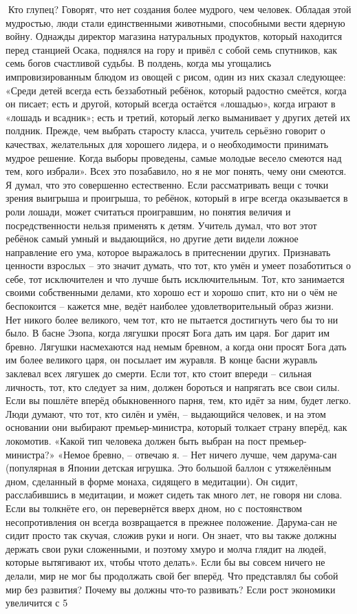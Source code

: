 \documentclass[a4paper]{book}
\begin{document}
Кто глупец?
Говорят, что нет создания более мудрого, чем человек. Обладая этой мудростью, люди
стали единственными животными, способными вести ядерную войну.
Однажды директор магазина натуральных продуктов, который находится перед
станцией Осака, поднялся на гору и привёл с собой семь спутников, как семь богов
счастливой судьбы. В полдень, когда мы угощались импровизированным блюдом из овощей с
рисом, один из них сказал следующее: «Среди детей всегда есть беззаботный ребёнок,
который радостно смеётся, когда он писает; есть и другой, который всегда остаётся
«лошадью», когда играют в «лошадь и всадник»; есть и третий, который легко выманивает у
других детей их полдник. Прежде, чем выбрать старосту класса, учитель серьёзно говорит о
качествах, желательных для хорошего лидера, и о необходимости принимать мудрое решение.
Когда выборы проведены, самые молодые весело смеются над тем, кого избрали».
Всех это позабавило, но я не мог понять, чему они смеются. Я думал, что это
совершенно естественно. Если рассматривать вещи с точки зрения выигрыша и проигрыша,
то ребёнок, который в игре всегда оказывается в роли лошади, может считаться
проигравшим, но понятия величия и посредственности нельзя применять к детям. Учитель
думал, что вот этот ребёнок самый умный и выдающийся, но другие дети видели ложное
направление его ума, которое выражалось в притеснении других. Признавать ценности
взрослых – это значит думать, что тот, кто умён и умеет позаботиться о себе, тот
исключителен и что лучше быть исключительным. Тот, кто занимается своими
собственными делами, кто хорошо ест и хорошо спит, кто ни о чём не беспокоится – кажется
мне, ведёт наиболее удовлетворительный образ жизни. Нет никого более великого, чем тот,
кто не пытается достигнуть чего бы то ни было.
В басне Эзопа, когда лягушки просят Бога дать им царя. Бог дарит им бревно. Лягушки
насмехаются над немым бревном, а когда они просят Бога дать им более великого царя, он
посылает им журавля. В конце басни журавль заклевал всех лягушек до смерти.
Если тот, кто стоит впереди – сильная личность, тот, кто следует за ним, должен
бороться и напрягать все свои силы. Если вы пошлёте вперёд обыкновенного парня, тем, кто
идёт за ним, будет легко. Люди думают, что тот, кто силён и умён, – выдающийся человек, и
на этом основании они выбирают премьер-министра, который толкает страну вперёд, как
локомотив.
«Какой тип человека должен быть выбран на пост премьер-министра?» «Немое
бревно, – отвечаю я. – Нет ничего лучше, чем дарума-сан (популярная в Японии детская
игрушка. Это большой баллон с утяжелённым дном, сделанный в форме монаха, сидящего в
медитации). Он сидит, расслабившись в медитации, и может сидеть так много лет, не говоря
ни слова. Если вы толкнёте его, он перевернётся вверх дном, но с постоянством несопротивления он всегда возвращается в прежнее положение. Дарума-сан не сидит просто
так скучая, сложив руки и ноги. Он знает, что вы также должны держать свои руки
сложенными, и поэтому хмуро и молча глядит на людей, которые вытягивают их, чтобы чтото делать».
Если бы вы совсем ничего не делали, мир не мог бы продолжать свой бег вперёд. Что
представлял бы собой мир без развития?
Почему вы должны что-то развивать? Если рост экономики увеличится с 5 %
\end{document}
